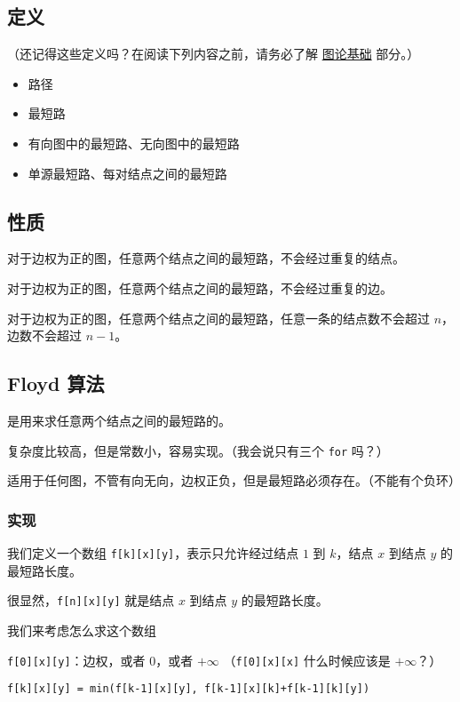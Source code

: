 
\subsection{定义}

（还记得这些定义吗？在阅读下列内容之前，请务必了解 \href{/graph/basic}{图论基础} 部分。）

\begin{itemize}
\item 路径
\item 最短路
\item 有向图中的最短路、无向图中的最短路
\item 单源最短路、每对结点之间的最短路
\end{itemize}

\subsection{性质}

对于边权为正的图，任意两个结点之间的最短路，不会经过重复的结点。

对于边权为正的图，任意两个结点之间的最短路，不会经过重复的边。

对于边权为正的图，任意两个结点之间的最短路，任意一条的结点数不会超过 $n$，边数不会超过 $n-1$。

\subsection{Floyd 算法}

是用来求任意两个结点之间的最短路的。

复杂度比较高，但是常数小，容易实现。（我会说只有三个 \texttt{for} 吗？）

适用于任何图，不管有向无向，边权正负，但是最短路必须存在。（不能有个负环）

\subsubsection{实现}

我们定义一个数组 \texttt{f[k][x][y]}，表示只允许经过结点 $1$ 到 $k$，结点 $x$ 到结点 $y$ 的最短路长度。

很显然，\texttt{f[n][x][y]} 就是结点 $x$ 到结点 $y$ 的最短路长度。

我们来考虑怎么求这个数组

\texttt{f[0][x][y]}：边权，或者 $0$，或者 $+\infty$ （\texttt{f[0][x][x]} 什么时候应该是 $+\infty$？）

\texttt{f[k][x][y] = min(f[k-1][x][y], f[k-1][x][k]+f[k-1][k][y])}

